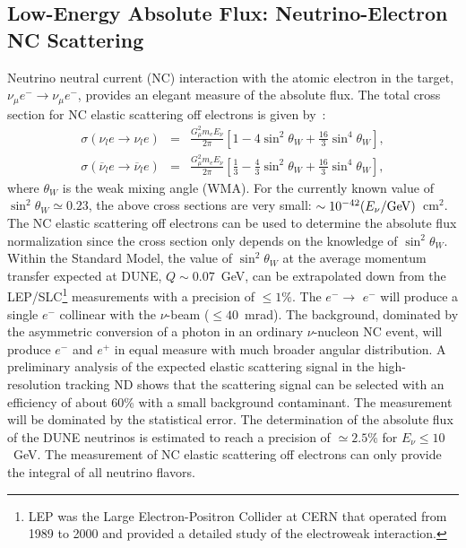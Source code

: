 \subsection{Low-Energy Absolute Flux: Neutrino-Electron NC Scattering}
\label{ssec:ncscatter}
Neutrino neutral current (NC) interaction with the atomic electron in the
target, $\nu_\mu e^- \rightarrow \nu_\mu e^-$, provides an elegant
measure of the absolute flux.  The total cross section for NC elastic
scattering off electrons is given by~\cite{Marciano:2003eq}:
\begin{eqnarray}
\sigma (\nu_l e \to \nu_l e) & = & \frac{G_\mu^2 m_e E_\nu}{2\pi} \left[ 1 -4 \sin^2 \theta_W + \frac{16}{3} \sin^4 \theta_W \right], \\
\sigma (\overline{\nu}_l e \to \overline{\nu}_l e) & = & \frac{G_\mu^2 m_e E_\nu}{2\pi} \left[ \frac{1}{3} -\frac{4}{3} \sin^2 \theta_W + \frac{16}{3} \sin^4 \theta_W \right], 
\end{eqnarray}
\noindent
where $\theta_W$ is the weak mixing angle (WMA).  For the currently
known value of $\sin^2 \theta_W\simeq0.23$, the above cross sections
are very small: $\sim 10^{-42} (E_\nu/{\rm GeV})$~cm$^2$. The NC
elastic scattering off electrons can be used to determine the absolute
flux normalization since the cross section only depends on the
knowledge of $\sin^2 \theta_W$. Within the Standard Model, the value
of $\sin^2 \theta_W$ at the average momentum transfer expected at
DUNE, $Q\sim0.07$~\si{\GeV}, can be extrapolated down from the
LEP/SLC\footnote{LEP was the Large Electron-Positron Collider at CERN
  that operated from 1989 to 2000 and provided a detailed study of the
  electroweak interaction.}  measurements with a precision of $\leq
1\%$. The \numu $e^- \rightarrow$ \numu $e^-$ will produce a single
$e^-$ collinear with the $\nu$-beam ($\leq 40$~mrad).  The background,
dominated by the asymmetric conversion of a photon in an ordinary
$\nu$-nucleon NC event, will produce $e^-$ and $e^+$ in equal measure
with much broader angular distribution.  A preliminary analysis of the
expected elastic scattering signal in the high-resolution tracking ND
shows that the scattering signal can be selected with an efficiency of
about 60\% with a small background contaminant. The measurement will
be dominated by the statistical error. %
The determination of the absolute flux of the DUNE neutrinos is
estimated to reach a precision of $\simeq 2.5\%$ for $E_\nu \leq
10$~\si{\GeV}.  The measurement of NC elastic scattering off electrons
can only provide the integral of all neutrino flavors.
